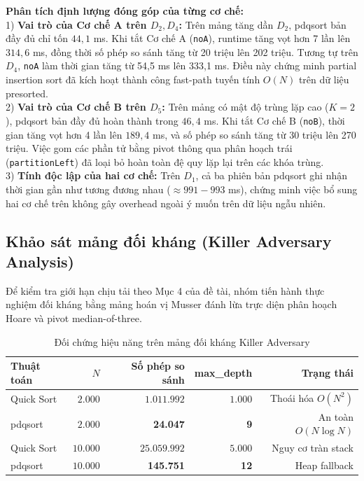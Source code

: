 \documentclass[conference]{IEEEtran}
\begin{document}
\textbf{Phân tích định lượng đóng góp của từng cơ chế:}\\
1) \textbf{Vai trò của Cơ chế A trên $D_2, D_4$:} Trên mảng tăng dần $D_2$, pdqsort bản đầy đủ chỉ tốn $44,1$ ms. Khi tắt Cơ chế A (\texttt{noA}), runtime tăng vọt hơn 7 lần lên $314,6$ ms, đồng thời số phép so sánh tăng từ 20 triệu lên 202 triệu. Tương tự trên $D_4$, \texttt{noA} làm thời gian tăng từ 54,5 ms lên 333,1 ms. Điều này chứng minh partial insertion sort đã kích hoạt thành công fast-path tuyến tính $O(N)$ trên dữ liệu presorted.\\
2) \textbf{Vai trò của Cơ chế B trên $D_5$:} Trên mảng có mật độ trùng lặp cao ($K=2$), pdqsort bản đầy đủ hoàn thành trong $46,4$ ms. Khi tắt Cơ chế B (\texttt{noB}), thời gian tăng vọt hơn 4 lần lên $189,4$ ms, và số phép so sánh tăng từ 30 triệu lên 270 triệu. Việc gom các phần tử bằng pivot thông qua phân hoạch trái (\texttt{partitionLeft}) đã loại bỏ hoàn toàn đệ quy lặp lại trên các khóa trùng.\\
3) \textbf{Tính độc lập của hai cơ chế:} Trên $D_1$, cả ba phiên bản pdqsort ghi nhận thời gian gần như tương đương nhau ($\approx 991 - 993$ ms), chứng minh việc bổ sung hai cơ chế trên không gây overhead ngoài ý muốn trên dữ liệu ngẫu nhiên.

\subsection{Khảo sát mảng đối kháng (Killer Adversary Analysis)}
Để kiểm tra giới hạn chịu tải theo Mục 4 của đề tài, nhóm tiến hành thực nghiệm đối kháng bằng mảng hoán vị Musser \cite{musser1997introsort} đánh lừa trực diện phân hoạch Hoare và pivot median-of-three.

\begin{table}[htbp]
\caption{Đối chứng hiệu năng trên mảng đối kháng Killer Adversary}
\label{tab:killer}
\centering
\footnotesize
\setlength{\tabcolsep}{2.5pt}
\begin{tabular*}{\columnwidth}{@{\extracolsep{\fill}}lrrrr@{}}
\toprule
\textbf{Thuật toán} & $N$ & \textbf{Số phép so sánh} & \textbf{max\_depth} & \textbf{Trạng thái} \\
\midrule
Quick Sort & $2.000$ & $1.011.992$ & $1.000$ & Thoái hóa $O(N^2)$ \\
pdqsort & $2.000$ & \textbf{24.047} & \textbf{9} & An toàn $O(N \log N)$ \\
\midrule
Quick Sort & $10.000$ & $25.059.992$ & $5.000$ & Nguy cơ tràn stack \\
pdqsort & $10.000$ & \textbf{145.751} & \textbf{12} & Heap fallback \\
\bottomrule
\end{tabular*}
\end{table}
\end{document}

